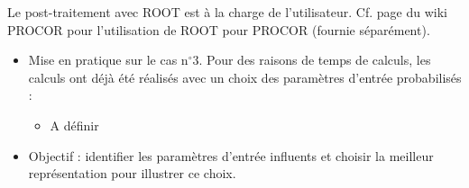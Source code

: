 \begin{frame}[fragile]
Le post-traitement avec ROOT est à la charge de l'utilisateur. Cf. page du wiki PROCOR pour l'utilisation de ROOT pour PROCOR (fournie séparément).


\begin{itemize}
    \item Mise en pratique sur le cas n$^{\circ}$3. Pour des raisons de temps de calculs, les calculs ont déjà été réalisés avec un choix des paramètres d'entrée probabilisés : 
    
    \begin{itemize}
        \item A définir
    \end{itemize}

    \item Objectif : identifier les paramètres d'entrée influents et choisir la meilleur représentation pour illustrer ce choix.
\end{itemize}

\end{frame}
